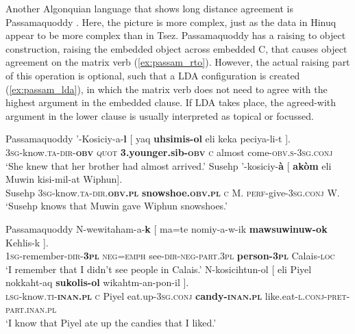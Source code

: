 \documentclass[output=paper
,modfonts
,nonflat]{langsci/langscibook}
\begin{document}
Another Algonquian language that shows long distance agreement is Passamaquoddy \citep{Bruening2001a}. Here, the picture is more complex, just as the data in Hinuq appear to be more complex than in Tsez. Passamaquoddy has a raising to object construction, raising the embedded object across embedded C, that causes object agreement on the matrix verb (\ref{ex:passam_rto}). However, the actual raising part of this operation is optional, such that a LDA configuration is created (\ref{ex:passam_lda}), in which the matrix verb does not need to agree with the highest argument in the embedded clause. If LDA takes place, the agreed-with argument in the lower clause is usually interpreted as topical or focussed.
\begin{exe}
\ex Passamaquoddy \citep[][258]{Bruening2001a}\label{ex:passam_rto}
	\xlist
	\ex	
		\gll '-Kosiciy-a-\textbf{l} [ yaq \textbf{uhsimis-ol} eli keka peciya-li-t ].\\
			 \textsc{3sg}-know.\textsc{ta-dir-\textbf{obv}} {} \textsc{quot} \textbf{3.younger.sib-\textsc{obv}} \textsc{c} almost come-\textsc{obv.s-3sg.conj}\\
		\glt `She knew that her brother had almost arrived.'
	\ex 
		\gll Susehp '-kosiciy-\textbf{\`{a}} [ \textbf{ak\`{o}m} eli Muwin kisi-mil-at Wiphun].\\
			 Susehp \textsc{3sg}-know.\textsc{ta-dir.\textbf{obv.pl}} {} \textbf{snowshoe.\textsc{obv.pl}} \textsc{c} M. \textsc{perf}-give-\textsc{3sg.conj} W.\\
		\glt `Susehp knows that Muwin gave Wiphun snowshoes.'
	\endxlist
\end{exe}
\begin{exe}
\ex Passamaquoddy \citep[][259]{Bruening2001a}\label{ex:passam_lda}
	\xlist
	\ex	\label{ex:passam_ti_lda}
		\gll N-wewitaham-a-\textbf{k} [ ma=te nomiy-a-w-ik \textbf{mawsuwinuw-ok} Kehlis-k ].\\
			 \textsc{1sg}-remember-\textsc{dir-\textbf{3pl}} {} \textsc{neg=emph} see-\textsc{dir-neg-part.3pl} \textbf{person-\textsc{3pl}} Calais-\textsc{loc} {}\\
		\glt `I remember that I didn't see people in Calais.'
	\ex
		\gll N-kosicihtun-ol [ eli Piyel nokkaht-aq \textbf{sukolis-ol} wikahtm-an-pon-il ].\\
			 \textsc{lsg}-know.\textsc{ti-\textbf{inan.pl}} {} \textsc{c} Piyel eat.up-\textsc{3sg.conj} \textbf{candy-\textsc{inan.pl}} like.eat-\textsc{l.conj-pret-part.inan.pl}\\
		\glt `I know that Piyel ate up the candies that I liked.'
	\endxlist
\end{exe}
\end{document}
